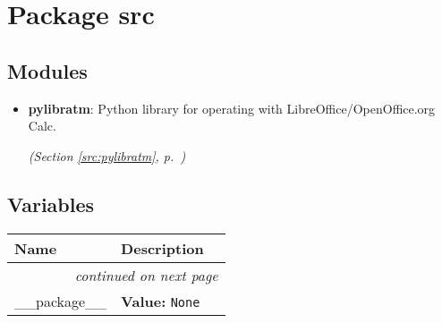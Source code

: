 %
%
%


\section{Package src}

    \label{src}


\subsection{Modules}

\begin{itemize}
\setlength{\parskip}{0ex}
\item \textbf{pylibratm}: Python library for operating with LibreOffice/OpenOffice.org Calc.



  \textit{(Section \ref{src:pylibratm}, p.~\pageref{src:pylibratm})}

\end{itemize}



  \subsection{Variables}

    \vspace{-1cm}
\hspace{\varindent}\begin{longtable}{|p{\varnamewidth}|p{\vardescrwidth}|l}
\cline{1-2}
\cline{1-2} \centering \textbf{Name} & \centering \textbf{Description}& \\
\cline{1-2}
\endhead\cline{1-2}\multicolumn{3}{r}{\small\textit{continued on next page}}\\\endfoot\cline{1-2}
\endlastfoot\raggedright \_\-\_\-p\-a\-c\-k\-a\-g\-e\-\_\-\_\- & \raggedright \textbf{Value:} 
{\tt None}&\\
\cline{1-2}
\end{longtable}

